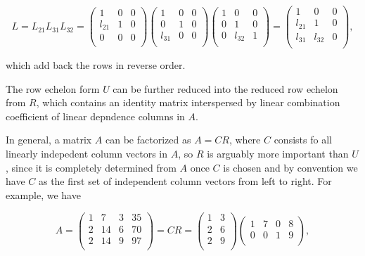 \documentclass[a4paper,12pt]{report}
\begin{document}
\begin{equation}
    L = L_{21}L_{31}L_{32} = \begin{pmatrix}
        1 & 0 &  0 \\
        l_{21}  & 1 &  0 \\
        0 & 0 &  0 \\
    \end{pmatrix}\begin{pmatrix}
        1 & 0 &  0 \\
        0 & 1 &  0 \\
        l_{31}  & 0 &  0 \\
    \end{pmatrix}\begin{pmatrix}
        1 & 0 &  0 \\
        0 & 1 &  0 \\
        0 & l_{32} &  1 \\
    \end{pmatrix} = \begin{pmatrix}
        1 & 0 &  0 \\
        l_{21}  & 1 &  0 \\
        l_{31}  & l_{32}  &  0 \\
    \end{pmatrix},
\end{equation}

which add back the rows in reverse order.

The row echelon form \(U\) can be further reduced into the reduced row echelon from \(R\), which contains an identity matrix interspersed by linear combination coefficient of linear depndence columns in \(A\).

In general, a matrix \(A\) can be factorized as \(A = CR\), where \(C\) consists fo all linearly indepedent column vectors in \(A\), so \(R\) is arguably more important than \(U\), since it is completely determined from \(A\) once \(C\) is chosen and by convention we have \(C\) as the first set of independent column vectors from left to right. For example, we have

\begin{equation}
    A = \begin{pmatrix}
        1 & 7 & 3 &  35 \\
        2 & 14 & 6 &  70 \\
        2 & 14 & 9 &  97 \\
    \end{pmatrix} = CR = \begin{pmatrix}
        1 &  3 \\
        2 &  6 \\
        2 &  9 \\
    \end{pmatrix} \begin{pmatrix}
        1 & 7 & 0 &  8 \\
        0 & 0 & 1 &  9 \\
    \end{pmatrix},
\end{equation}
\end{document}

